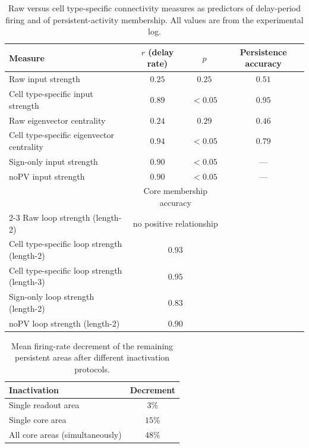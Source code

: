 \documentclass[11pt]{article}
\begin{document}
\begin{table}[htbp]
\centering
\caption{Raw versus cell type-specific connectivity measures as predictors of delay-period firing and of persistent-activity membership. All values are from the experimental log.}
\label{tab:measures}
\begin{tabular}{lccc}
\toprule
Measure & $r$ (delay rate) & $p$ & Persistence accuracy \\
\midrule
Raw input strength & $0.25$ & $0.25$ & $0.51$ \\
Cell type-specific input strength & $0.89$ & $<0.05$ & $0.95$ \\
Raw eigenvector centrality & $0.24$ & $0.29$ & $0.46$ \\
Cell type-specific eigenvector centrality & $0.94$ & $<0.05$ & $0.79$ \\
Sign-only input strength & $0.90$ & $<0.05$ & --- \\
noPV input strength & $0.90$ & $<0.05$ & --- \\
\midrule
& \multicolumn{2}{c}{Core membership accuracy} & \\
\cmidrule(lr){2-3}
Raw loop strength (length-2) & \multicolumn{2}{c}{no positive relationship} & \\
Cell type-specific loop strength (length-2) & \multicolumn{2}{c}{$0.93$} & \\
Cell type-specific loop strength (length-3) & \multicolumn{2}{c}{$0.95$} & \\
Sign-only loop strength (length-2) & \multicolumn{2}{c}{$0.83$} & \\
noPV loop strength (length-2) & \multicolumn{2}{c}{$0.90$} & \\
\bottomrule
\end{tabular}
\end{table}

\begin{table}[htbp]
\centering
\caption{Mean firing-rate decrement of the remaining persistent areas after different inactivation protocols.}
\label{tab:inhibition}
\begin{tabular}{lc}
\toprule
Inactivation & Decrement \\
\midrule
Single readout area & $3\%$ \\
Single core area & $15\%$ \\
All core areas (simultaneously) & $48\%$ \\
\bottomrule
\end{tabular}
\end{table}
\end{document}
